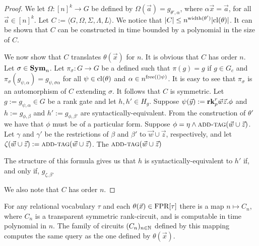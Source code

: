 \documentclass[../paper.tex]{subfiles}
\begin{document}
\begin{proof}
  We let $\Omega : [n]^k \rightarrow G$ be defined by $\Omega (\vec{a}) =
  g_{\theta', \alpha}$, where $\alpha \vec{x} = \vec{a}$, for all $\vec{a} \in
  [n]^k$. Let $C := \langle G, \Omega, \Sigma, \Lambda, L \rangle$. We notice
  that $\vert C \vert \leq n^{\mathrm{width}(\theta')} \vert \mathrm{cl}(\theta) \vert$. It can
  be shown that $C$ can be constructed in time bounded by a polynomial in the
  size of $C$.

  We now show that $C$ translates $\theta(\vec{x})$ for $n$. It is obvious that
  $C$ has order $n$. Let $\sigma \in \text{\textbf{Sym}}_n$. Let $\pi_\sigma : G \rightarrow G$
  be a defined such that $\pi (g) = g$ if $g \in G_c$ and $\pi_\sigma(g_{\psi,
    \alpha}) = g_{\psi, \sigma \alpha}$ for all $\psi \in \mathrm{cl}(\theta)$ and
  $\alpha \in n^{\mathrm{free}(()\psi)}$. It is easy to see that $\pi_\sigma$ is an
  automorphism of $C$ extending $\sigma$. It follows that $C$ is symmetric. Let
  $g := g_{\psi, \alpha} \in G$ be a rank gate and let $h, h' \in H_g$. Suppose
  $\psi (\vec{y}) := \text{\textbf{rk}}^r_p \vec{w} \vec{z}. \phi$ and $h := g_{\phi, \beta}$
  and $h' := g_{\phi, \beta'}$ are syntactically-equivalent. From the
  construction of $\theta'$ we have that $\phi$ must be of a particular form.
  Suppose $\phi = \eta \land {\normalfont\textsc{add-tag}}(\vec{w} \cup \vec{z})$. Let $\gamma$
  and $\gamma'$ be the restrictions of $\beta$ and $\beta'$ to $\vec{w} \cup
  \vec{z}$, respectively, and let $\zeta(\vec{w}\cup\vec{z}) :=
  {\normalfont\textsc{add-tag}}(\vec{w} \cup \vec{z})$. The ${\normalfont\textsc{add-tag}} (\vec{w} \cup \vec{z})$


  The structure of this formula gives us that $h$ is syntactically-equivalent to
  $h'$ if, and only if, $g_{\zeta , \beta'}$




  We also note that $C$ has order $n$.


\end{proof}

\begin{thm}
  For any relational vocabulary $\tau$ and each $\theta(\vec{x}) \in \text{\upshape FPR}[\tau]$
  there is a map $n \mapsto C_n$, where $C_n$ is a transparent symmetric
  rank-circuit, and is computable in time polynomial in $n$. The family of
  circuits $(C_n)_{n \in \mathbb{N}}$ defined by this mapping computes the same query
  as the one defined by $\theta(\vec{x})$.
  \label{thm:translating-formulas-to-circuits}
\end{thm}
\end{document}
